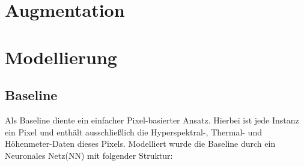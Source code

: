 \section{Augmentation}

\section{Modellierung}

\subsection{Baseline}
Als Baseline diente ein einfacher Pixel-basierter Ansatz. Hierbei ist jede Instanz ein Pixel und enthält ausschließlich
die Hyperspektral-, Thermal- und Höhenmeter-Daten dieses Pixels.
Modelliert wurde die Baseline durch ein Neuronales Netz(NN) mit folgender Struktur:

